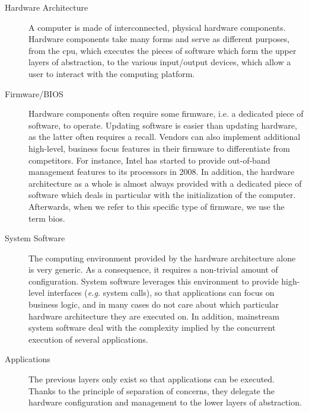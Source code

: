 \begin{description}
\item [Hardware Architecture]
  A computer is made of interconnected, physical hardware components.
  Hardware components take many forms and serve as different purposes, from the
  \ac{cpu}, which executes the pieces of software which form the upper layers of
  abstraction, to the various input/output devices, which allow a user to
  interact with the computing platform.
\item [Firmware/BIOS]
  Hardware components often require some firmware, i.e. a dedicated piece of
  software, to operate.
  Updating software is easier than updating hardware, as the latter often
  requires a recall.
  Vendors can also implement additional high-level, business focus features in
  their firmware to differentiate from competitors.
  For instance, Intel has started to provide out-of-band management features to
  its processors in 2008. 
  In addition, the hardware architecture as a whole is almost always provided
  with a dedicated piece of software which deals in particular with the
  initialization of the computer.
  Afterwards, when we refer to this specific type of firmware, we use the term
  \ac{bios}.
\item [System Software]
  The computing environment provided by the hardware architecture alone is very
  generic.
  As a consequence, it requires a non-trivial amount of configuration.
  System software leverages this environment to provide high-level interfaces
  (\emph{e.g.} system calls), so that applications can focus on business logic,
  and in many cases do not care about which particular hardware architecture
  they are executed on.
  In addition, mainstream system software deal with the complexity implied by
  the concurrent execution of several applications.
\item [Applications]
  The previous layers only exist so that applications can be executed.
  Thanks to the principle of separation of concerns, they delegate the hardware
  configuration and management to the lower layers of abstraction.
\end{description}

